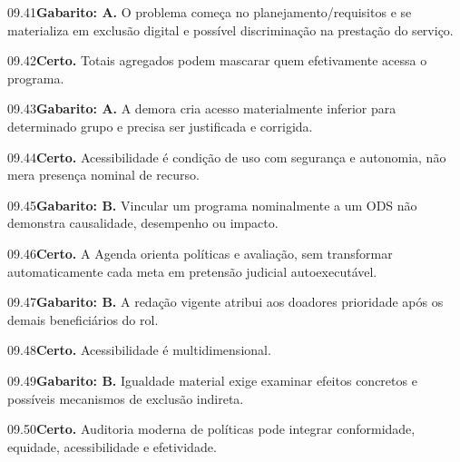 \begin{solucao}{09.41}\textbf{Gabarito: A.} O problema começa no planejamento/requisitos e se materializa em exclusão digital e possível discriminação na prestação do serviço.\end{solucao}
\begin{solucao}{09.42}\textbf{Certo.} Totais agregados podem mascarar quem efetivamente acessa o programa.\end{solucao}
\begin{solucao}{09.43}\textbf{Gabarito: A.} A demora cria acesso materialmente inferior para determinado grupo e precisa ser justificada e corrigida.\end{solucao}
\begin{solucao}{09.44}\textbf{Certo.} Acessibilidade é condição de uso com segurança e autonomia, não mera presença nominal de recurso.\end{solucao}
\begin{solucao}{09.45}\textbf{Gabarito: B.} Vincular um programa nominalmente a um ODS não demonstra causalidade, desempenho ou impacto.\end{solucao}
\begin{solucao}{09.46}\textbf{Certo.} A Agenda orienta políticas e avaliação, sem transformar automaticamente cada meta em pretensão judicial autoexecutável.\end{solucao}
\begin{solucao}{09.47}\textbf{Gabarito: B.} A redação vigente atribui aos doadores prioridade após os demais beneficiários do rol.\end{solucao}
\begin{solucao}{09.48}\textbf{Certo.} Acessibilidade é multidimensional.\end{solucao}
\begin{solucao}{09.49}\textbf{Gabarito: B.} Igualdade material exige examinar efeitos concretos e possíveis mecanismos de exclusão indireta.\end{solucao}
\begin{solucao}{09.50}\textbf{Certo.} Auditoria moderna de políticas pode integrar conformidade, equidade, acessibilidade e efetividade.\end{solucao}
